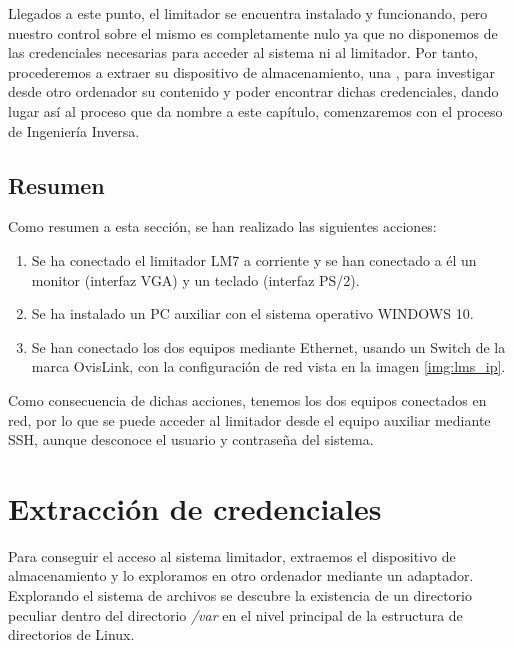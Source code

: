 Llegados a este punto, el limitador se encuentra instalado y funcionando, pero nuestro control sobre el mismo es completamente nulo ya que no disponemos de las credenciales necesarias para acceder al sistema ni al limitador. Por tanto, procederemos a extraer su dispositivo de almacenamiento, una , para investigar desde otro ordenador su contenido y poder encontrar dichas credenciales, dando lugar así al proceso que da nombre a este capítulo, comenzaremos con el proceso de Ingeniería Inversa.

\subsection{Resumen}

Como resumen a esta sección, se han realizado las siguientes acciones:

\begin{enumerate}
    \item Se ha conectado el limitador \acrshort{LM7} a corriente y se han conectado a él un monitor (interfaz VGA) y un teclado (interfaz PS/2).
    \item Se ha instalado un \acrshort{PC} auxiliar con el sistema operativo \gls{WINDOWS} 10.
    \item Se han conectado los dos equipos mediante Ethernet, usando un Switch de la marca OvisLink, con la configuración de red vista en la imagen \ref{img:lms_ip}.
\end{enumerate}

Como consecuencia de dichas acciones, tenemos los dos equipos conectados en red, por lo que se puede acceder al limitador desde el equipo auxiliar mediante \acrshort{SSH}, aunque desconoce el usuario y contraseña del sistema.

\section{Extracción de credenciales}

Para conseguir el acceso al sistema limitador, extraemos el dispositivo de almacenamiento y lo exploramos en otro ordenador mediante un adaptador. Explorando el sistema de archivos se descubre la existencia de un directorio peculiar dentro del directorio \textit{/var} en el nivel principal de la estructura de directorios de Linux.

